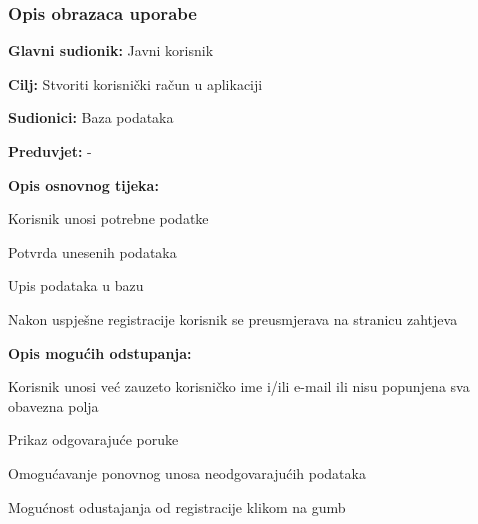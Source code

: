 				\subsubsection{Opis obrazaca uporabe}
					\noindent {}
					\begin{packed_item}
						
						\item \textbf{Glavni sudionik: }Javni korisnik
						\item  \textbf{Cilj:} Stvoriti korisnički račun u aplikaciji
						\item  \textbf{Sudionici:} Baza podataka
						\item  \textbf{Preduvjet:} -
						\item  \textbf{Opis osnovnog tijeka:}
						
						\item[] \begin{packed_enum}
							
							\item Korisnik unosi potrebne podatke
							\item Potvrda unesenih podataka
							\item Upis podataka u bazu
							\item Nakon uspješne registracije korisnik se preusmjerava na stranicu zahtjeva
						\end{packed_enum}
						
						\item  \textbf{Opis mogućih odstupanja:}
						
						\item[] \begin{packed_item}
							
							\item[1.a] Korisnik unosi već zauzeto korisničko ime i/ili e-mail ili nisu popunjena sva obavezna polja
							\item[] \begin{packed_enum}
								
								\item Prikaz odgovarajuće poruke
								\item Omogućavanje ponovnog unosa neodgovarajućih podataka
								
							\end{packed_enum}
							
							\item[4.a] Mogućnost odustajanja od registracije klikom na gumb
							
						\end{packed_item}
					\end{packed_item}
				
